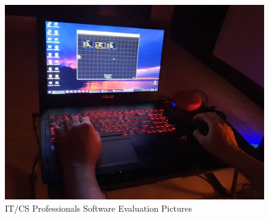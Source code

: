 \begin{figure}[H]
	 \centering
	 \includegraphics[width=\textwidth]{evaluators/tech/f_jb.jpg}
	 \caption[]{IT/CS Professionals Software Evaluation Pictures}
\end{figure}

